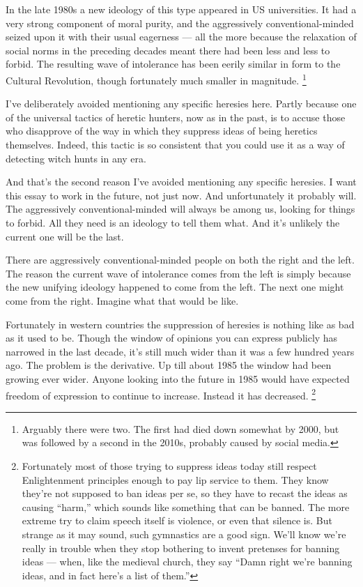 In the late 1980s a new ideology of this type appeared in US
universities. It had a very strong component of moral purity, and the
aggressively conventional-minded seized upon it with their usual
eagerness --- all the more because the relaxation of social norms in the
preceding decades meant there had been less and less to forbid. The
resulting wave of intolerance has been eerily similar in form to the
Cultural Revolution, though fortunately much smaller in magnitude.
\footnote{Arguably there were two. The first had died down somewhat by
2000, but was followed by a second in the 2010s, probably caused by
social media.}

I've deliberately avoided mentioning any specific heresies here. Partly
because one of the universal tactics of heretic hunters, now as in the
past, is to accuse those who disapprove of the way in which they
suppress ideas of being heretics themselves. Indeed, this tactic is so
consistent that you could use it as a way of detecting witch hunts in
any era.

And that's the second reason I've avoided mentioning any specific
heresies. I want this essay to work in the future, not just now. And
unfortunately it probably will. The aggressively conventional-minded
will always be among us, looking for things to forbid. All they need is
an ideology to tell them what. And it's unlikely the current one will be
the last.

There are aggressively conventional-minded people on both the right and
the left. The reason the current wave of intolerance comes from the left
is simply because the new unifying ideology happened to come from the
left. The next one might come from the right. Imagine what that would be
like.

Fortunately in western countries the suppression of heresies is nothing
like as bad as it used to be. Though the window of opinions you can
express publicly has narrowed in the last decade, it's still much wider
than it was a few hundred years ago. The problem is the derivative. Up
till about 1985 the window had been growing ever wider. Anyone looking
into the future in 1985 would have expected freedom of expression to
continue to increase. Instead it has decreased. \footnote{Fortunately most of those trying to suppress ideas today still
respect Enlightenment principles enough to pay lip service to them. They
know they're not supposed to ban ideas per se, so they have to recast
the ideas as causing ``harm,'' which sounds like something that can be
banned. The more extreme try to claim speech itself is violence, or even
that silence is. But strange as it may sound, such gymnastics are a good
sign. We'll know we're really in trouble when they stop bothering to
invent pretenses for banning ideas --- when, like the medieval church,
they say ``Damn right we're banning ideas, and in fact here's a list of
them.''}

